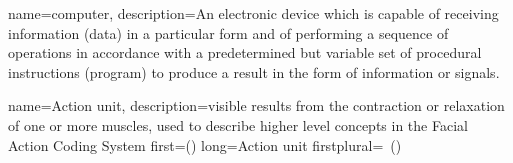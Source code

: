  {
	name={computer}, 
	description={An electronic device which is capable of receiving information (data) in a particular form and of performing a sequence of operations in accordance with a predetermined but variable set of procedural instructions (program) to produce a result in the form of information or signals.
}
}

 {
	name={Action unit}, 
	description={visible results from the contraction or relaxation of one or more muscles, used to describe higher level concepts in the Facial Action Coding System
}
	first={}()
	long={Action unit}
	firstplural={\glspluralsuffix\ (\glspluralsuffix )}
	
}
